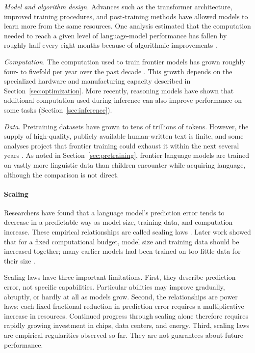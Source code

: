 \documentclass[11pt]{article}
\begin{document}
\textit{Model and algorithm design.} Advances such as the transformer architecture, improved training procedures, and post-training methods have allowed models to learn more from the same resources. One analysis estimated that the computation needed to reach a given level of language-model performance has fallen by roughly half every eight months because of algorithmic improvements \citep{Ho2024AlgorithmicProgress}.

\textit{Computation.} The computation used to train frontier models has grown roughly four- to fivefold per year over the past decade \citep{Sevilla2024ComputeTrends}. This growth depends on the specialized hardware and manufacturing capacity described in Section~\ref{sec:optimization}. More recently, reasoning models have shown that additional computation used during inference can also improve performance on some tasks (Section~\ref{sec:inference}).

\textit{Data.} Pretraining datasets have grown to tens of trillions of tokens. However, the supply of high-quality, publicly available human-written text is finite, and some analyses project that frontier training could exhaust it within the next several years \citep{Villalobos2024Data}.
As noted in Section~\ref{sec:pretraining}, frontier language models are trained on vastly more linguistic data than children encounter while acquiring language, although the comparison is not direct.
\paragraph{Scaling}

Researchers have found that a language model's prediction error tends to decrease in a predictable way as model size, training data, and computation increase. These empirical relationships are called scaling laws \citep{Kaplan2020Scaling}. Later work showed that for a fixed computational budget, model size and training data should be increased together; many earlier models had been trained on too little data for their size \citep{Hoffmann2022Chinchilla}.

Scaling laws have three important limitations. First, they describe prediction error, not specific capabilities. Particular abilities may improve gradually, abruptly, or hardly at all as models grow. Second, the relationships are power laws:
each fixed fractional reduction in prediction error requires a multiplicative increase in resources. Continued progress through scaling alone therefore requires rapidly growing investment in chips, data centers, and energy. Third, scaling laws are empirical regularities observed so far. They are not guarantees about future performance.
\end{document}

